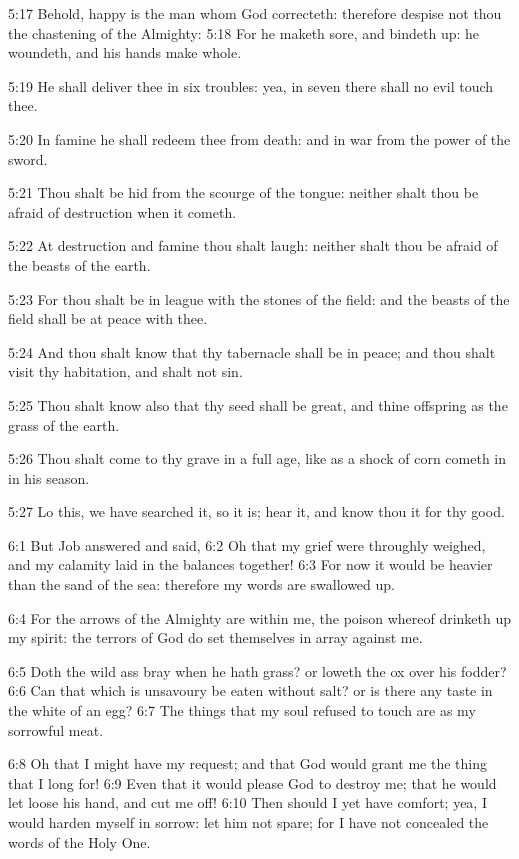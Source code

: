 5:17 Behold, happy is the man whom God correcteth: therefore despise not thou the chastening of the Almighty: 5:18 For he maketh sore, and bindeth up: he woundeth, and his hands make whole.

5:19 He shall deliver thee in six troubles: yea, in seven there shall no evil touch thee.

5:20 In famine he shall redeem thee from death: and in war from the power of the sword.

5:21 Thou shalt be hid from the scourge of the tongue: neither shalt thou be afraid of destruction when it cometh.

5:22 At destruction and famine thou shalt laugh: neither shalt thou be afraid of the beasts of the earth.

5:23 For thou shalt be in league with the stones of the field: and the beasts of the field shall be at peace with thee.

5:24 And thou shalt know that thy tabernacle shall be in peace; and thou shalt visit thy habitation, and shalt not sin.

5:25 Thou shalt know also that thy seed shall be great, and thine offspring as the grass of the earth.

5:26 Thou shalt come to thy grave in a full age, like as a shock of corn cometh in in his season.

5:27 Lo this, we have searched it, so it is; hear it, and know thou it for thy good.

6:1 But Job answered and said, 6:2 Oh that my grief were throughly weighed, and my calamity laid in the balances together!  6:3 For now it would be heavier than the sand of the sea: therefore my words are swallowed up.

6:4 For the arrows of the Almighty are within me, the poison whereof drinketh up my spirit: the terrors of God do set themselves in array against me.

6:5 Doth the wild ass bray when he hath grass? or loweth the ox over his fodder?  6:6 Can that which is unsavoury be eaten without salt? or is there any taste in the white of an egg?  6:7 The things that my soul refused to touch are as my sorrowful meat.

6:8 Oh that I might have my request; and that God would grant me the thing that I long for!  6:9 Even that it would please God to destroy me; that he would let loose his hand, and cut me off!  6:10 Then should I yet have comfort; yea, I would harden myself in sorrow: let him not spare; for I have not concealed the words of the Holy One.

